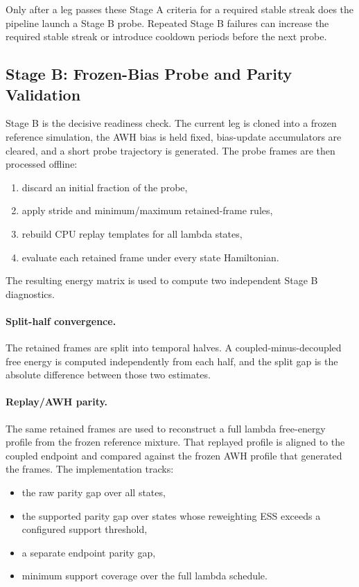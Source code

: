 Only after a leg passes these Stage A criteria for a required stable streak does the pipeline launch a Stage B probe. Repeated Stage B failures can increase the required stable streak or introduce cooldown periods before the next probe.

\subsection{Stage B: Frozen-Bias Probe and Parity Validation}

Stage B is the decisive readiness check. The current leg is cloned into a frozen reference simulation, the AWH bias is held fixed, bias-update accumulators are cleared, and a short probe trajectory is generated. The probe frames are then processed offline:

\begin{enumerate}
    \item discard an initial fraction of the probe,
    \item apply stride and minimum/maximum retained-frame rules,
    \item rebuild CPU replay templates for all lambda states,
    \item evaluate each retained frame under every state Hamiltonian.
\end{enumerate}

The resulting energy matrix is used to compute two independent Stage B diagnostics.

\paragraph{Split-half convergence.}

The retained frames are split into temporal halves. A coupled-minus-decoupled free energy is computed independently from each half, and the split gap is the absolute difference between those two estimates.

\paragraph{Replay/AWH parity.} 

The same retained frames are used to reconstruct a full lambda free-energy profile from the frozen reference mixture. That replayed profile is aligned to the coupled endpoint and compared against the frozen AWH profile that generated the frames. The implementation tracks:

\begin{itemize}
    \item the raw parity gap over all states,
    \item the supported parity gap over states whose reweighting ESS exceeds a     configured support threshold,
    \item a separate endpoint parity gap,
    \item minimum support coverage over the full lambda schedule.
\end{itemize}

